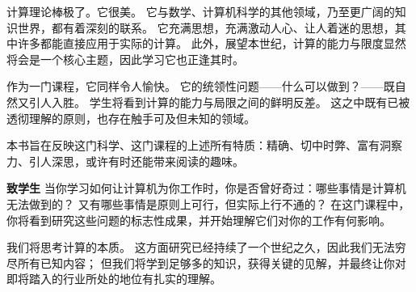 \newcommand{\aphorism}[3]{%
  \vspace{3ex plus 1ex minus .2ex}%
  \noindent\parbox{.85\textwidth}{\raggedright\itshape #1 \\ 
    \hspace*{\fill}{\upshape -- #2, \MakeUppercase{#3}}}}

\newcommand{\header}[1]{\vspace{1ex plus 0.1ex minus 0.02ex}\par\noindent\textbf{#1}\hspace{0.55em plus 0.1em minus 0.05em}}

\par{}
\vspace{3ex}

计算理论棒极了。它很美。
它与数学、计算机科学的其他领域，乃至更广阔的知识世界，都有着深刻的联系。
它充满思想，充满激动人心、让人着迷的思想，其中许多都能直接应用于实际的计算。
此外，展望本世纪，计算的能力与限度显然将会是一个核心主题，因此学习它也正逢其时。

作为一门课程，它同样令人愉快。
它的统领性问题——什么可以做到？——既自然又引人入胜。
学生将看到计算的能力与局限之间的鲜明反差。
这之中既有已被透彻理解的原则，也存在触手可及但未知的领域。

本书旨在反映这门科学、这门课程的上述所有特质：精确、切中时弊、富有洞察力、引人深思，或许有时还能带来阅读的趣味。

\header{致学生}
当你学习如何让计算机为你工作时，你是否曾好奇过：哪些事情是计算机无法做到的？
又有哪些事情是原则上可行，但实际上行不通的？
在这门课程中，你将看到研究这些问题的标志性成果，并开始理解它们对你的工作有何影响。

我们将思考计算的本质。
这方面研究已经持续了一个世纪之久，因此我们无法穷尽所有已知内容；
但我们将学到足够多的知识，获得关键的见解，并最终让你对即将踏入的行业所处的地位有扎实的理解。


